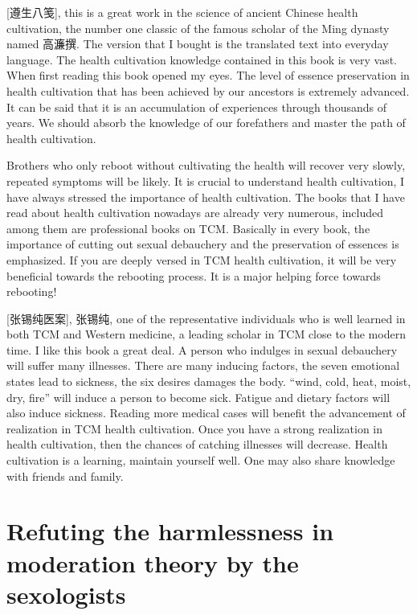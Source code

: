 \documentclass[
]{book}
\begin{document}
{[}遵生八笺{]}, this is a great work in the science of ancient Chinese health cultivation, the number one classic of the famous scholar of the Ming dynasty named 高濂撰. The version that I bought is the translated text into everyday language. The health cultivation knowledge contained in this book is very vast. When first reading this book opened my eyes. The level of essence preservation in health cultivation that has been achieved by our ancestors is extremely advanced. It can be said that it is an accumulation of experiences through thousands of years. We should absorb the knowledge of our forefathers and master the path of health cultivation.

Brothers who only reboot without cultivating the health will recover very slowly, repeated symptoms will be likely. It is crucial to understand health cultivation, I have always stressed the importance of health cultivation. The books that I have read about health cultivation nowadays are already very numerous, included among them are professional books on TCM. Basically in every book, the importance of cutting out sexual debauchery and the preservation of essences is emphasized. If you are deeply versed in TCM health cultivation, it will be very beneficial towards the rebooting process. It is a major helping force towards rebooting!

{[}张锡纯医案{]}, 张锡纯, one of the representative individuals who is well learned in both TCM and Western medicine, a leading scholar in TCM close to the modern time. I like this book a great deal. A person who indulges in sexual debauchery will suffer many illnesses. There are many inducing factors, the seven emotional states lead to sickness, the six desires damages the body. ``wind, cold, heat, moist, dry, fire'' will induce a person to become sick. Fatigue and dietary factors will also induce sickness. Reading more medical cases will benefit the advancement of realization in TCM health cultivation. Once you have a strong realization in health cultivation, then the chances of catching illnesses will decrease. Health cultivation is a learning, maintain yourself well. One may also share knowledge with friends and family.

\hypertarget{refuting-the-harmlessness-in-moderation-theory-by-the-sexologists}{%
\chapter{Refuting the harmlessness in moderation theory by the sexologists}\label{refuting-the-harmlessness-in-moderation-theory-by-the-sexologists}}
\end{document}

